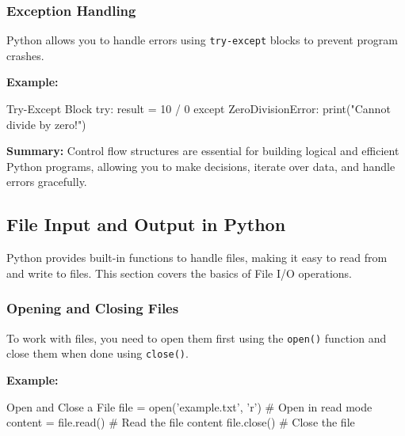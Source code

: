%
\subsubsection{Exception Handling}

Python allows you to handle errors using \texttt{try-except} blocks to prevent program crashes.

\textbf{Example:}
\begin{codeonly}{Try-Except Block}
try:
    result = 10 / 0
except ZeroDivisionError:
    print("Cannot divide by zero!")
\end{codeonly}

\textbf{Summary:} Control flow structures are essential for building logical and efficient Python programs, allowing you to make decisions, iterate over data, and handle errors gracefully.


%
\subsection{File Input and Output in Python}

Python provides built-in functions to handle files, making it easy to read from and write to files. This section covers the basics of File I/O operations.

%
\subsubsection{Opening and Closing Files}

To work with files, you need to open them first using the \texttt{open()} function and close them when done using \texttt{close()}.

\textbf{Example:}
\begin{codeonly}{Open and Close a File}
file = open('example.txt', 'r')  # Open in read mode
content = file.read()  # Read the file content
file.close()  # Close the file
\end{codeonly}

%
